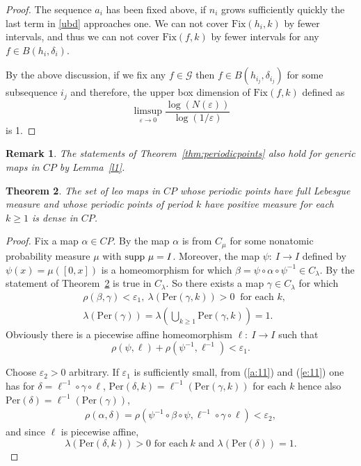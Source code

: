 \documentclass[12pt, a4paper]{amsart}
\newtheorem{theorem}{Theorem}[section]
\newtheorem{remark}[theorem]{Remark}
\def\eps{\varepsilon}
\def\supp{\mbox{\rm supp}}
\def\ge{\geqslant}
\def\per{\mathrm{Per}}
\newcommand{\?}{{\bf ???}}
\newcommand{\fix}{\mathrm{Fix}}
\begin{document}
\begin{proof}
The sequence $a_i$ has been fixed above, 
if $n_i$ grows sufficiently quickly the last term in \eqref{ubd} approaches one. 
We can not cover  $\fix(h_i,k) $ by fewer intervals, and thus we can not cover $\fix(f,k)$ by fewer intervals for any $f \in B(h_{i},\delta_{ i})$. 

By the above discussion, if we fix any $f\in \mathcal{G}$ then $f\in B(h_{i_j},\delta_{i_j})$ for some subsequence $i_j$ and therefore,
 the upper box dimension of $\fix(f,k)$
defined as 
$$\limsup_{\eps \to 0} \frac{\log (N(\eps)) }{\log(1/\eps)}$$
is 1.
\end{proof}


\begin{remark}
The statements of Theorem~\ref{thm:periodicpoints} also hold for generic maps in $CP$ by Lemma~\ref{l1}.
\end{remark}

\begin{theorem}\label{t-PP}
	The set of leo maps in $CP$
	whose periodic points have full Lebesgue measure and whose periodic points of period $k$ have positive measure for each $k \ge 1$
	is dense in $CP$.
\end{theorem}

\begin{proof}Fix a map $\alpha\in CP$. By \cite[Remark, p. 2536]{BCOT} the map  $\alpha$ is from $C_{\mu}$ for some nonatomic probability measure $\mu$ with $\supp~\mu=I$. Moreover, the map $\psi\colon~I\to I$ defined by $\psi(x)=\mu([0,x])$ is a homeomorphism for which $\beta=\psi\circ\alpha\circ \psi^{-1}\in C_{\lambda}$. By \cite[Theorem 2]{BCOT} the statement of Theorem~\ref{t-PP} is true in $C_{\lambda}$.  So there exists a map $\gamma\in C_{\lambda}$ for which  \begin{align}\label{a:11}&\rho(\beta,\gamma)<\varepsilon_1,~\lambda(\per(\gamma,k))>0~\text{ for each }k,\\&\lambda(\per(\gamma))=\lambda(\bigcup_{k\ge 1}\per(\gamma,k))=1.\nonumber
\end{align}
Obviously there is a piecewise affine homeomorphism $\ell\colon~I\to I$ such that \begin{equation}\label{e:11}\rho(\psi,\ell)+\rho(\psi^{-1},\ell^{-1})<\varepsilon_1.
\end{equation}


Choose $\varepsilon_2>0$ arbitrary. If $\varepsilon_1$ is sufficiently small, from (\ref{a:11}) and (\ref{e:11}) one has for $\delta=\ell^{-1}\circ \gamma\circ \ell$, $\per(\delta,k)=\ell^{-1}(\per(\gamma,k))$ for each $k$ hence also $\per(\delta)=\ell^{-1}(\per(\gamma))$,
\begin{align*}\rho(\alpha,\delta)=\rho(\psi^{-1}\circ\beta\circ \psi,\ell^{-1}\circ\gamma\circ\ell)<\varepsilon_2,\end{align*}
and since $\ell$ is piecewise affine, 
$$
\lambda(\per(\delta,k))>0\text{ for each}~k  \text{ and } \lambda(\per(\delta))=1. 
$$
\par \vspace{-2.2\baselineskip}  \qedhere
\end{proof}
\end{document}
